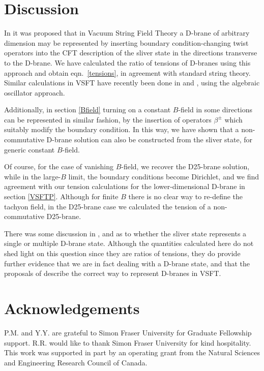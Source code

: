 \documentclass[letterpaper,12pt]{article}
\def\er#1{eqn.~\eqref{#1}}
\begin{document}
\section{Discussion}
\label{discuss}

In \cite{RSZ4} it was proposed that in Vacuum String Field Theory a D-brane of arbitrary dimension may be represented 
by inserting boundary condition-changing twist operators into the CFT
description of the sliver state in the directions transverse to the D-brane.
We have calculated the ratio of tensions of D-branes using this approach and obtain
\er{tensions},  in agreement with standard string theory. Similar calculations
in VSFT have recently been done in \cite{BMM} and \cite{Okuyama}, using the
algebraic oscillator approach.

Additionally, in section \ref{Bfield} turning on a constant $B$-field in some directions can be represented
in similar fashion, by the insertion of operators $\beta^\pm$ which suitably
modify the boundary condition. In this way, we have shown that a non-commutative D-brane
solution can also be constructed from the sliver state, for generic constant $B$-field.

Of course, for the case of vanishing $B$-field, we recover the D25-brane solution, while
in the large-$B$ limit, the boundary conditions become Dirichlet, and we find agreement
with our tension calculations for the lower-dimensional D-brane in section \ref{VSFTP}.
Although for finite $B$ there is no clear way to re-define the tachyon field, in
the D25-brane case we calculated the tension of a non-commutative D25-brane.

There was some discussion in \cite{HK}, \cite{RSZ6} and \cite{RV} as to whether the sliver state
represents a single or multiple D-brane state. Although the quantities calculated here do not
shed light on this question since they are ratios of tensions, they 
do provide further evidence that we are in fact dealing with a D-brane state,
and that the proposals of \cite{RSZ4} describe the correct way to represent
D-branes in VSFT.


\section*{\small Acknowledgements }
P.M. and Y.Y. are grateful to Simon Fraser University for Graduate Fellowship support.
R.R. would like to thank Simon Fraser University for kind hospitality.
This work was supported in part by an operating grant from the
Natural Sciences and Engineering Research Council of Canada.
\end{document}
